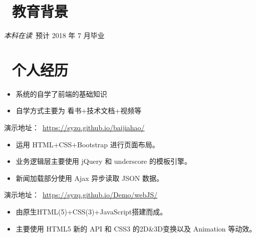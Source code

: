 \documentclass{resume}
\begin{document}


  

 
\section{\faGraduationCap\  教育背景}
\textit{本科在读}\ 预计 2018 年 7 月毕业


\section{\faUser\ 个人经历}
\begin{itemize}
  \item 系统的自学了前端的基础知识
  \item 自学方式主要为 看书+技术文档+视频等
  
\end{itemize}

\begin{onehalfspacing}
演示地址：\faLink \ \href{https://syzq.github.io/baijiahao/}{https://syzq.github.io/baijiahao/}
\begin{itemize}
  \item 运用 HTML+CSS+Bootstrap 进行页面布局。
  \item 业务逻辑层主要使用 jQuery 和 underscore 的模板引擎。
  \item 新闻加载部分使用 Ajax 异步读取 JSON 数据。
\end{itemize}
\end{onehalfspacing}

\begin{onehalfspacing}
演示地址：\faLink \ \href{https://syzq.github.io/Demo/webJS/}{https://syzq.github.io/Demo/webJS/}
\begin{itemize}
  \item 由原生HTML(5)+CSS(3)+JavaScript搭建而成。
  \item 主要使用 HTML5 新的 API 和 CSS3 的2D\&3D变换以及 Animation 等动效。
\end{itemize}
\end{onehalfspacing}
\end{document}
